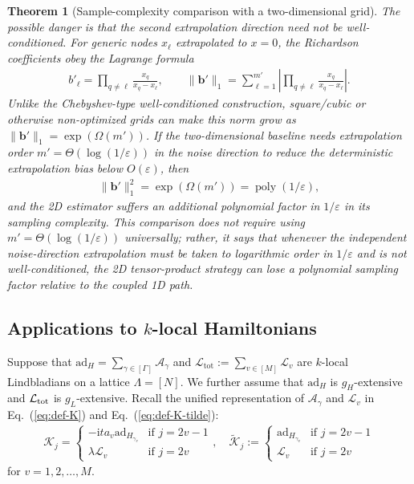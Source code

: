 \documentclass[11pt]{article}
\newtheorem{theorem}{Theorem}
\newcommand{\eq}[1]{(\ref{eq:#1})}
\renewcommand{\i}{\mathrm{i}}
\renewcommand{\L}{\mathcal{L}}
\newcommand{\ad}{\mathrm{ad}}
\newcommand{\A}{\mathcal{A}}
\newcommand{\tot}{\mathrm{tot}}
\newcommand{\eps}{\varepsilon}
\newcommand{\mc}{\mathcal}
\begin{document}
\begin{theorem}[Sample-complexity comparison with a two-dimensional grid]
The possible danger is that the second extrapolation direction need not be well-conditioned. For generic nodes $x_\ell$ extrapolated to $x=0$, the Richardson coefficients obey the Lagrange formula
\begin{align*}
    b'_\ell=\prod_{q\ne \ell}\frac{x_q}{x_q-x_\ell},
    \qquad
    \|\mathbf b'\|_1=\sum_{\ell=1}^{m'}\left|
    \prod_{q\ne \ell}\frac{x_q}{x_q-x_\ell}
    \right|.
\end{align*}
Unlike the Chebyshev-type well-conditioned construction, square/cubic or otherwise non-optimized grids can make this norm grow as $\|\mathbf b'\|_1=\exp(\Omega(m'))$. If the two-dimensional baseline needs extrapolation order $m'=\Theta(\log(1/\eps))$ in the noise direction to reduce the deterministic extrapolation bias below $O(\eps)$, then
\begin{align*}
    \|\mathbf b'\|_1^2=\exp(\Omega(m'))=\operatorname{poly}(1/\eps),
\end{align*}
and the 2D estimator suffers an additional polynomial factor in $1/\eps$ in its sampling complexity. This comparison does not require using $m'=\Theta(\log(1/\eps))$ universally; rather, it says that whenever the independent noise-direction extrapolation must be taken to logarithmic order in $1/\eps$ and is not well-conditioned, the 2D tensor-product strategy can lose a polynomial sampling factor relative to the coupled 1D path.
\end{theorem}

\subsection{Applications to $k$-local Hamiltonians}
\label{sec:local}
Suppose that $\ad_H=\sum_{\gamma\in[\Gamma]}\A_\gamma$ and $\mc L_{\tot}:=\sum_{v\in [M]}\mc L_v$ are $k$-local Lindbladians on a lattice $\Lambda = [N]$. We further assume that $\ad_H$ is $g_H$-extensive and $\L_{\rm tot}$ is $g_L$-extensive.
Recall the unified representation of $\mc A_{\gamma}$ and $\mc L_v$ in Eq.~\eq{def-K} and Eq.~\eq{def-K-tilde}: \begin{align*}
    \mathcal{K}_j = \begin{cases}-\i ta_{v}\ad_{H_{\gamma_v}} & \text{if } j = 2v-1 \\ \lambda\mathcal{L}_v & \text{if } j = 2v \end{cases}, \quad \tilde{\mathcal{K}}_j := \begin{cases}\ad_{H_{\gamma_v}} & \text{if } j = 2v-1\\ \mathcal{L}_v & \text{if } j = 2v \end{cases} 
\end{align*}
for $v=1, 2,\ldots, M$.  
\end{document}
